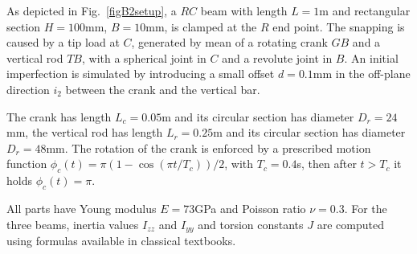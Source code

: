 \documentclass[review]{elsarticle}
\begin{document}
As depicted in Fig.~\ref{figB2setup}, a $RC$ beam with length $L=1$m and rectangular section  $H=100$mm, $B=10$mm, is clamped at the $R$ end point.
The snapping is caused by a tip load at $C$, generated by mean of a rotating crank $GB$ and a vertical rod $TB$, with a spherical joint in $C$ and a revolute joint in $B$. An initial imperfection is simulated by introducing a small offset $d=0.1$mm in the off-plane direction $i_2$ between the crank and the vertical bar. 

The crank has length $L_c=0.05$m and its circular section has diameter $D_r=24$mm, the vertical rod 
has length $L_r=0.25$m and its circular section has diameter $D_r=48$mm.
The rotation of the crank is enforced by a prescribed motion function 
$\phi_c(t)= \pi(1-\cos(\pi t/T_c) )/2$, with $T_c = 0.4$s, 
then after $t>T_c$ it holds $\phi_c(t)=\pi$.

All parts have Young modulus $E = 73$GPa and Poisson ratio $\nu = 0.3$. For the three beams, inertia values $I_{zz}$ and $I_{yy}$ and torsion constants $J$ are computed using formulas available in classical textbooks. 
\end{document}
